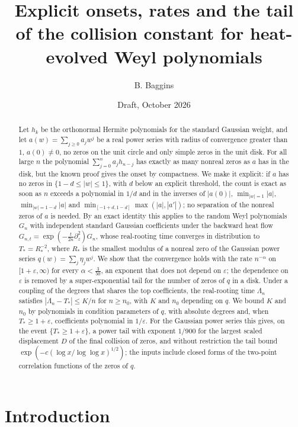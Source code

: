 \documentclass[11pt]{amsart}
\title[Explicit onsets, rates and the tail of the collision constant]{Explicit onsets, rates and the tail of the collision constant for heat-evolved Weyl polynomials}
\author{B. Baggins}
\date{Draft, October 2026}
\theoremstyle{definition}
\theoremstyle{remark}
\numberwithin{equation}{section}
\newcommand{\eps}{\varepsilon}
\begin{document}
\begin{abstract}
Let $h_k$ be the orthonormal Hermite polynomials for the standard Gaussian weight, and let $a(w)=\sum_{j\ge0}a_jw^j$ be a real power series with radius of convergence greater than $1$, $a(0)\ne0$, no zeros on the unit circle and only simple zeros in the unit disk. For all large $n$ the polynomial $\sum_{j=0}^{n}a_jh_{n-j}$ has exactly as many nonreal zeros as $a$ has in the disk, but the known proof gives the onset by compactness. We make it explicit: if $a$ has no zeros in $\{1-d\le|w|\le1\}$, with $d$ below an explicit threshold, the count is exact as soon as $n$ exceeds a polynomial in $1/d$ and in the inverses of $|a(0)|$, $\min_{|w|=1}|a|$, $\min_{|w|=1-d}|a|$ and $\min_{[-1+d,1-d]}\max(|a|,|a'|)$; no separation of the nonreal zeros of $a$ is needed. By an exact identity this applies to the random Weyl polynomials $G_n$ with independent standard Gaussian coefficients under the backward heat flow $G_{n,t}=\exp(-\frac t{2n}\partial_z^2)G_n$, whose real-rooting time converges in distribution to $T_*=R_*^{-2}$, where $R_*$ is the smallest modulus of a nonreal zero of the Gaussian power series $q(w)=\sum_j\eta_jw^j$. We show that the convergence holds with the rate $n^{-\alpha}$ on $[1+\eps,\infty)$ for every $\alpha<\frac3{50}$, an exponent that does not depend on $\eps$; the dependence on $\eps$ is removed by a super-exponential tail for the number of zeros of $q$ in a disk. Under a coupling of the degrees that shares the top coefficients, the real-rooting time $\Lambda_n$ satisfies $|\Lambda_n-T_*|\le K/n$ for $n\ge n_0$, with $K$ and $n_0$ depending on $q$. We bound $K$ and $n_0$ by polynomials in condition parameters of $q$, with absolute degrees and, when $T_*\ge1+\eps$, coefficients polynomial in $1/\eps$. For the Gaussian power series this gives, on the event $\{T_*\ge1+\eps\}$, a power tail with exponent $1/900$ for the largest scaled displacement $D$ of the final collision of zeros, and without restriction the tail bound $\exp(-c(\log x/\log\log x)^{1/2})$; the inputs include closed forms of the two-point correlation functions of the zeros of $q$.
\end{abstract}

\maketitle

\section{Introduction}\label{sec:intro}
\end{document}
